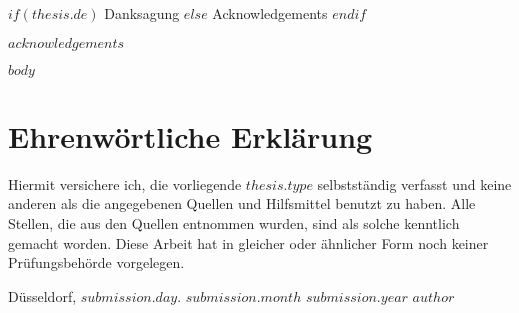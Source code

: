\cleardoublepage
\begin{center} 
    \huge 
    $if(thesis.de)$
    Danksagung
    $else$
    Acknowledgements
    $endif$
\end{center}
$acknowledgements$

\cleardoublepage

\tableofcontents

\listoffigures %

\listoftables %


\mainmatter

$body$

\backmatter

\printbibliography

\cleardoublepage

\printindex

\chapter*{Ehrenwörtliche Erklärung}

Hiermit versichere ich, die vorliegende $thesis.type$ selbstständig verfasst und keine anderen als die angegebenen Quellen und Hilfsmittel benutzt zu haben.
Alle Stellen, die aus den Quellen entnommen wurden, sind als solche kenntlich gemacht worden.
Diese Arbeit hat in gleicher oder ähnlicher Form noch keiner Prüfungsbehörde vorgelegen.

\vspace{3cm}

\noindent Düsseldorf, $submission.day$. $submission.month$ $submission.year$ \hfill $author$


\cleardoublepage
